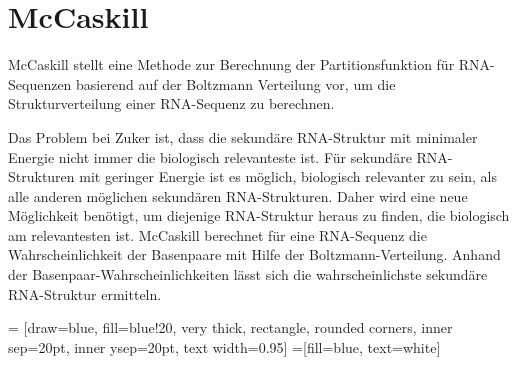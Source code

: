 \section{McCaskill}

McCaskill stellt eine Methode zur Berechnung der Partitionsfunktion für RNA-Sequenzen basierend auf der Boltzmann Verteilung vor, um die Strukturverteilung einer RNA-Sequenz zu berechnen.

\vspace{1.5em}

Das Problem bei Zuker ist, dass die sekundäre RNA-Struktur mit minimaler Energie nicht immer die biologisch relevanteste ist. Für sekundäre RNA-Strukturen mit geringer Energie ist es möglich, biologisch relevanter zu sein, als alle anderen möglichen sekundären RNA-Strukturen. Daher wird eine neue Möglichkeit benötigt, um diejenige RNA-Struktur heraus zu finden, die biologisch am relevantesten ist. McCaskill berechnet für eine RNA-Sequenz die Wahrscheinlichkeit der Basenpaare mit Hilfe der Boltzmann-Verteilung. Anhand der Basenpaar-Wahrscheinlichkeiten lässt sich die wahrscheinlichste sekundäre RNA-Struktur ermitteln.

\vspace{1.5em}

 = [draw=blue, fill=blue!20, very thick, rectangle, rounded corners, inner sep=20pt, inner ysep=20pt, text width=0.95\textwidth]
 =[fill=blue, text=white]
%  


